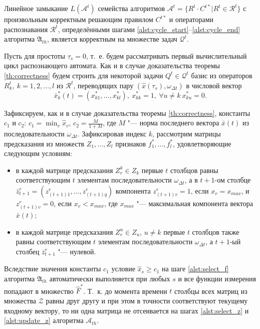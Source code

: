 \begin{Theorem}
	\label{th:correctness_t}
	Линейное замыкание $L(\mathcal A^t)$ семейства алгоритмов $\mathcal A^t=\{R^t\cdot C^{t*}|R^t\in\mathcal R^t\}$ с произвольным корректным решающим правилом $C^{t*}$ и операторами распознавания $\mathcal R^t$, определёнными шагами \ref{alst:cycle_start}--\ref{alst:cycle_end} алгоритма $\mathfrak A_{th}$, является корректным на множестве задач $\mathcal Q^t$.
\end{Theorem}

\begin{Proof}
	Пусть для простоты $\tau_s=0$, т.~е. будем рассматривать первый вычислительный цикл распознающего автомата. Как и в случае доказательства теоремы \ref{th:correctness} будем строить для некоторой задачи $Q^t\in \mathcal Q^t$ базис из операторов $R_k^t,\ k=1,2,\dots,l$ из $\mathcal R^t$, переводящих пару $(\hat x(\tau_s), \omega_{\Delta t})$ в числовой вектор
	\begin{equation}\label{crit:fillness_t}
		\bar x_k^*(t)=(x_{k1}^*,\dots,x_{kl}^*),\ x_{kk}^*=1,\ \forall u\neq k\ x_{ku}^*=0.
	\end{equation}
	
	Зафиксируем, как и в случае доказательства теоремы \ref{th:correctness}, константы $c_1$ и $c_2$: $c_1=\min_v\hat x_v$, $c_2=\frac{M}{1+M}$, где $M$ "--- норма последнего вектора $\bar x(t)$ из последовательности $\omega_{\Delta t}$. Зафиксировав индекс $k$, рассмотрим матрицы предсказания из множеств $Z_1,\dots,Z_l$ признаков $f_1^*,\dots,f_l^*$, удовлетворяющие следующим условиям:
	
	\begin{itemize}
		\item в каждой матрице предсказания $Z_r^k\in Z_k$ первые $t$ столбцов равны соответствующим $t$ элементам последовательности $\omega_{\Delta t}$, а в $t+1$-ом столбце $\bar z_{t+1}^r=(z_{(t+1)1}^r,\dots,z_{(t+1)q}^r)$ компонента $z_{(t+1)v}^r=1$, если $x_v=x_{max}$, и $z_{(t+1)v}^r=0$, если $x_v<x_{max}$, где $x_{max}$ "--- максимальная компонента вектора $\bar x(t)$;
		\item в каждой матрице предсказания $Z_r^u\in Z_u$, $u\not = k$ первые $t$ столбцов также равны соответствующим $t$ элементам последовательности $\omega_{\Delta t}$, а $t+1$-ый столбец $\bar z_{t+1}^r$ "--- нулевой.
	\end{itemize}
	
	Вследствие значения константы $c_1$ условие $\hat x_s\geqslant c_1$ на шаге \ref{alst:select_f} алгоритма $\mathfrak A_{th}$ автоматически выполняется при любых $s$ и все функции измерения попадают в множество $\hat F^*$. Т.~к. до момента времени $t$ столбцы всех матриц из множества $\mathcal Z$ равны друг другу и при этом в точности соответствуют текущему входному вектору, то ни одна матрица не отсеивается на шагах \ref{alst:select_z} и \ref{alst:update_z} алгоритма $\mathcal A_{th}$.
	

\end{Proof}
